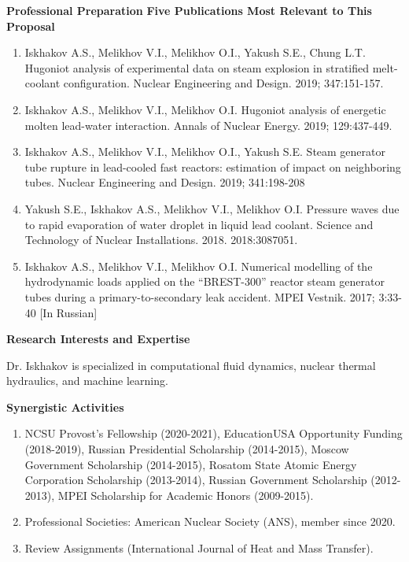 \documentclass[11pt,letterpaper,english]{article}
\begin{document}
\begin{flushleft} {\bf Professional Preparation}
\vspace{.04in}
{\bf Five Publications Most Relevant to This Proposal}
\vspace{-6pt}
\begin{enumerate} \itemsep1pt \parskip0pt 
\item Iskhakov A.S., Melikhov V.I., Melikhov O.I., Yakush S.E., Chung L.T. Hugoniot analysis of experimental data on steam explosion in stratified melt-coolant configuration. Nuclear Engineering and Design. 2019; 347:151-157. \\ 
\item Iskhakov A.S., Melikhov V.I., Melikhov O.I. Hugoniot analysis of energetic molten lead-water interaction. Annals of Nuclear Energy. 2019; 129:437-449.  \\ 
\item Iskhakov A.S., Melikhov V.I., Melikhov O.I., Yakush S.E. Steam generator tube rupture in lead-cooled fast reactors: estimation of impact on neighboring tubes. Nuclear Engineering and Design. 2019; 341:198-208 \\ 
\item Yakush S.E., Iskhakov A.S., Melikhov V.I., Melikhov O.I. Pressure waves due to rapid evaporation of water droplet in liquid lead coolant. Science and Technology of Nuclear Installations. 2018. 2018:3087051.\\ 
\item Iskhakov A.S., Melikhov V.I., Melikhov O.I. Numerical modelling of the hydrodynamic loads applied on the “BREST-300” reactor steam generator tubes during a primary-to-secondary leak accident. MPEI Vestnik. 2017; 3:33-40 [In Russian]  \\ 
\end{enumerate} 

\vspace{-6pt}
{\bf Research Interests and Expertise}
{\parindent 16pt

Dr. Iskhakov is specialized in computational fluid dynamics, nuclear thermal hydraulics, and machine learning.
}

\vspace{.04in}
{\bf Synergistic Activities}
\vspace{-6pt}
\begin{enumerate} \itemsep1pt \parskip0pt 
\item  NCSU Provost’s Fellowship (2020-2021), EducationUSA Opportunity Funding (2018-2019), Russian Presidential Scholarship (2014-2015), Moscow Government Scholarship (2014-2015), Rosatom State Atomic Energy Corporation Scholarship (2013-2014), Russian Government Scholarship (2012-2013), MPEI Scholarship for Academic Honors (2009-2015). \\ 
\item Professional Societies: American Nuclear Society (ANS), member since 2020. \\ 
\item Review Assignments (International Journal of Heat and Mass Transfer). \\ 
\end{enumerate} 


\end{flushleft}
\end{document}
